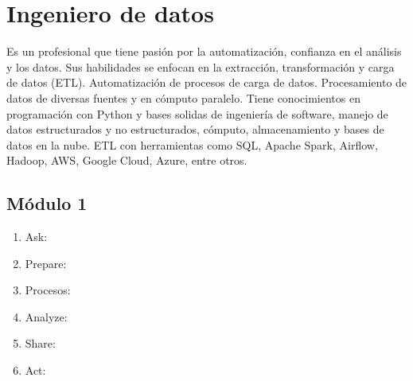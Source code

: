 \chapter{Ingeniero de datos}
Es un profesional que tiene pasi\'on por la automatizaci\'on, confianza en el an\'alisis y los datos. Sus habilidades se enfocan en la 
extracci\'on, transformaci\'on y carga de datos (ETL). Automatizaci\'on de procesos de carga de datos. Procesamiento de datos de diversas fuentes y en c\'omputo
paralelo. Tiene conocimientos en programaci\'on con Python y bases solidas de ingenier\'ia de software, manejo de datos estructurados y no estructurados, c\'omputo, almacenamiento y bases de datos en la nube. 
ETL con herramientas como SQL, Apache Spark, Airflow, Hadoop, AWS, Google Cloud, Azure, entre otros.

\section{M\'odulo 1}

\begin{enumerate}
    \item Ask:
    \item Prepare:
    \item Procesos:
    \item Analyze:
    \item Share:
    \item Act:
\end{enumerate}


